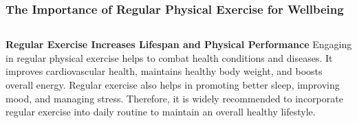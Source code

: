 \documentclass[5pt]{beamer}
\begin{document}
\begin{frame}
\frametitle{The Importance of Regular Physical Exercise for Wellbeing}
\begin{columns}
\begin{column}{0.7\textwidth}
\begin{block}{\textbf{Regular Exercise Increases Lifespan and Physical Performance}}
Engaging in regular physical exercise helps to combat health conditions and diseases. It improves cardiovascular health, maintains healthy body weight, and boosts overall energy. Regular exercise also helps in promoting better sleep, improving mood, and managing stress. Therefore, it is widely recommended to incorporate regular exercise into daily routine to maintain an overall healthy lifestyle.
\end{block}
\end{column}
\end{columns}
\end{frame}
\end{document}
